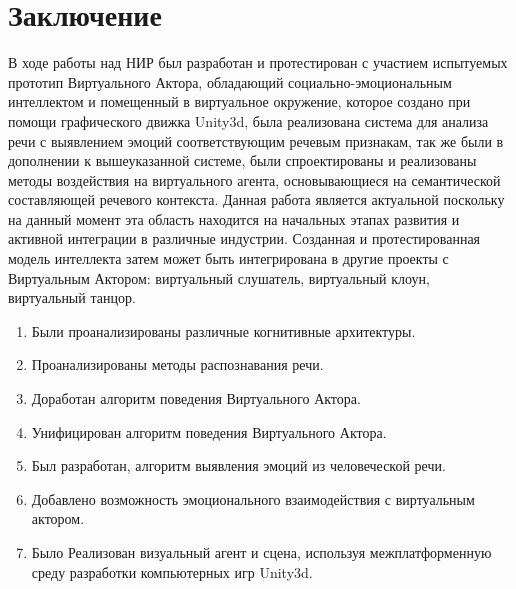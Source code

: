 \chapter*{Заключение}

В ходе работы над НИР был разработан и протестирован с участием испытуемых прототип Виртуального Актора, 
обладающий социально-эмоциональным интеллектом и помещенный в виртуальное окружение, которое создано при помощи графического движка Unity3d, 
была реализована система для анализа речи с выявлением эмоций соответствующим речевым признакам, так же были
в дополнении к вышеуказанной системе, были спроектированы и реализованы методы 
воздействия на виртуального агента, основывающиеся на семантической составляющей речевого контекста.
Данная работа является актуальной поскольку на данный момент эта область находится на начальных этапах 
развития и активной интеграции в различные индустрии.
Созданная и протестированная модель интеллекта затем может быть интегрирована в другие проекты с 
Виртуальным Актором: виртуальный слушатель, виртуальный клоун, виртуальный танцор. 

\begin{enumerate}
    \item Были проанализированы различные когнитивные архитектуры.
    \item Проанализированы методы распознавания речи.
    \item Доработан алгоритм поведения Виртуального Актора.
    \item Унифицирован алгоритм поведения Виртуального Актора.
    \item Был разработан, алгоритм выявления эмоций из человеческой речи.
    \item Добавлено возможность эмоционального взаимодействия с виртуальным актором.
    \item Было Реализован визуальный агент и сцена, используя межплатформенную среду разработки компьютерных игр Unity3d.
\end{enumerate}



